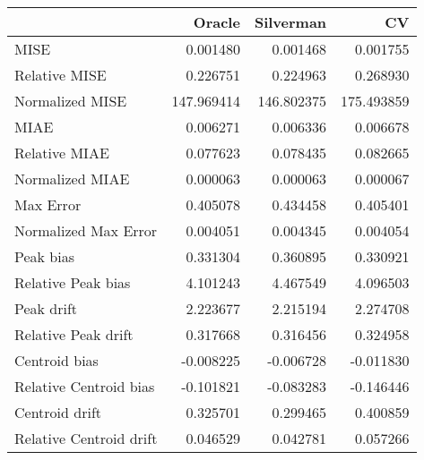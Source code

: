 \begin{tabular}{lrrr}
  \hline
 & Oracle & Silverman & CV \\ 
  \hline
MISE & 0.001480 & 0.001468 & 0.001755 \\ 
  Relative MISE & 0.226751 & 0.224963 & 0.268930 \\ 
  Normalized MISE & 147.969414 & 146.802375 & 175.493859 \\ 
  MIAE & 0.006271 & 0.006336 & 0.006678 \\ 
  Relative MIAE & 0.077623 & 0.078435 & 0.082665 \\ 
  Normalized MIAE & 0.000063 & 0.000063 & 0.000067 \\ 
  Max Error & 0.405078 & 0.434458 & 0.405401 \\ 
  Normalized Max Error & 0.004051 & 0.004345 & 0.004054 \\ 
  Peak bias & 0.331304 & 0.360895 & 0.330921 \\ 
  Relative Peak bias & 4.101243 & 4.467549 & 4.096503 \\ 
  Peak drift & 2.223677 & 2.215194 & 2.274708 \\ 
  Relative Peak drift & 0.317668 & 0.316456 & 0.324958 \\ 
  Centroid bias & -0.008225 & -0.006728 & -0.011830 \\ 
  Relative Centroid bias & -0.101821 & -0.083283 & -0.146446 \\ 
  Centroid drift & 0.325701 & 0.299465 & 0.400859 \\ 
  Relative Centroid drift & 0.046529 & 0.042781 & 0.057266 \\ 
   \hline
\end{tabular}
